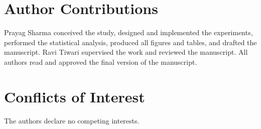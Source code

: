 \documentclass{ieeeaccess}
\begin{document}
\section*{Author Contributions}

Prayag Sharma conceived the study, designed and implemented the experiments, performed the
statistical analysis, produced all figures and tables, and drafted the manuscript. Ravi
Tiwari supervised the work and reviewed the manuscript. All authors read and approved the
final version of the manuscript.

\section*{Conflicts of Interest}

The authors declare no competing interests.
\end{document}
